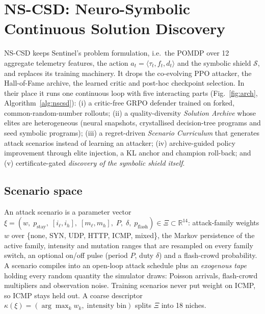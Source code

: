 \section{NS-CSD: Neuro-Symbolic Continuous Solution Discovery}
\label{sec:method}

NS-CSD keeps Sentinel's problem formulation, i.e.\ the POMDP over 12 aggregate
telemetry features, the action $a_t=\langle\tau_t,f_t,d_t\rangle$ and the symbolic
shield $\mathcal{S}$, and replaces its training machinery. It drops the co-evolving
PPO attacker, the Hall-of-Fame archive, the learned critic and post-hoc
checkpoint selection. In their place it runs one continuous loop with five
interacting parts (Fig.~\ref{fig:arch}, Algorithm~\ref{alg:nscsd}):
(i) a critic-free GRPO defender trained on forked, common-random-number rollouts;
(ii) a quality-diversity \emph{Solution Archive} whose elites are heterogeneous
(neural snapshots, crystallised decision-tree programs and seed symbolic programs);
(iii) a regret-driven \emph{Scenario Curriculum} that generates attack scenarios
instead of learning an attacker; (iv) archive-guided policy improvement through
elite injection, a KL anchor and champion roll-back; and (v) certificate-gated
\emph{discovery of the symbolic shield itself}.

\subsection{Scenario space}
\label{sec:scenarios}
An attack scenario is a parameter vector
$\xi=(w,\;p_{\text{stay}},\;[i_\ell,i_h],\;[m_\ell,m_h],\;P,\;\delta,\;p_{\text{flash}})\in\Xi\subset\mathbb{R}^{14}$:
attack-family weights $w$ over \{none, SYN, UDP, HTTP, ICMP, mixed\}, the Markov
persistence of the active family, intensity and mutation ranges that are
resampled on every family switch, an optional on/off pulse (period $P$, duty
$\delta$) and a flash-crowd probability. A scenario compiles into an
open-loop attack schedule plus an \emph{exogenous tape} holding every random
quantity the simulator draws: Poisson arrivals, flash-crowd multipliers and
observation noise. Training scenarios never put weight on ICMP, so ICMP
stays held out. A coarse descriptor
$\kappa(\xi)=(\arg\max_k w_k,\;\text{intensity bin})$ splits $\Xi$ into 18 niches.

